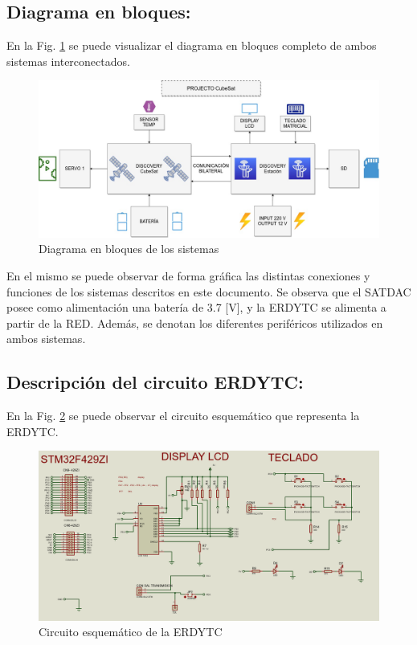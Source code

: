\documentclass[conference]{IEEEtran}
\begin{document}
\subsection{Diagrama en bloques:}
\label{sec:org20faff3}
En la Fig. \ref{fig:diagramaBloques} se puede visualizar el diagrama en bloques completo de ambos sistemas interconectados.

\begin{figure}[htbp]
\centering
\includegraphics[width=.9\linewidth]{../../images/diagramaBloques.jpg}
\caption{\label{fig:diagramaBloques}Diagrama en bloques de los sistemas}
\end{figure}

En el mismo se puede observar de forma gráfica las distintas conexiones y funciones de los sistemas descritos en este documento. Se observa que el SATDAC posee como alimentación una batería de 3.7 [V], y la ERDYTC se alimenta a partir de la RED. Además, se denotan los diferentes periféricos utilizados en ambos sistemas.
\subsection{Descripción del circuito ERDYTC:}
\label{sec:org48694b2}
En la Fig. \ref{fig:estacionEsquematico} se puede observar el circuito esquemático que representa la ERDYTC.

\begin{figure}[htbp]
\centering
\includegraphics[width=.9\linewidth]{../../images/estacionEsquematico.png}
\caption{\label{fig:estacionEsquematico}Circuito esquemático de la ERDYTC}
\end{figure}
\end{document}
